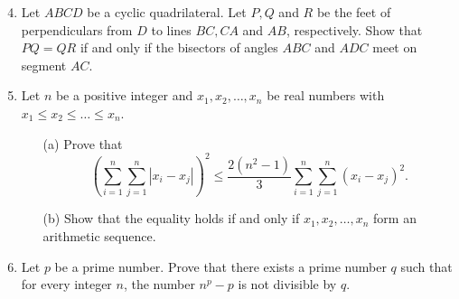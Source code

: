 \documentclass[12pt]{article}
\begin{document}
\begin{enumerate}
\setcounter{enumi}{3}
\item %
Let $ABCD$ be a cyclic quadrilateral. Let $P, Q$ and $R$ be the feet of perpendiculars from $D$ to lines $BC, CA$ and $AB$, respectively. Show that $PQ = QR$ if and only if the bisectors of angles $ABC$ and $ADC$ meet on segment $AC$. 



\item %
Let $n$ be a positive integer and $x_1, x_2, \dots , x_n$ be real numbers with $x_1 \le x_2 \le \dots \le x_n$. 
\begin{enumerate} 
\item [(a)] 
Prove that 
\[ 
\left(\sum_{i=1}^{n}\sum_{j=1}^{n} |x_i - x_j|\right)^2 
\le 
\frac{2(n^2 - 1)}{3}\sum_{i=1}^{n}\sum_{j=1}^{n} (x_i - x_j)^2. 
\] 
\item [(b)] 
Show that the equality holds if and only if $x_1, x_2, \dots , x_n$ form an arithmetic sequence. 
\end{enumerate}

\item %
Let $p$ be a prime number. Prove that there exists a prime number $q$ such that for every integer $n$, the number $n^p - p$ is not divisible by $q$. 


\end{enumerate}
\end{document}
